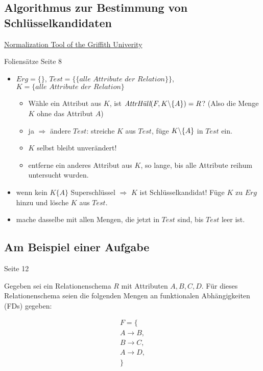 \documentclass{lehramt-informatik}
\begin{document}
\subsection{Algorithmus zur Bestimmung von Schlüsselkandidaten}

\href{http://www.ict.griffith.edu.au/~jw/normalization/ind.php}
{Normalization Tool of the Griffith Univerity}

Foliensätze Seite 8

\begin{itemize}
\item
$Erg = \{\}$,
$Test = \{\{\textit{alle Attribute der Relation}\}\}$,
$K = \{\textit{alle Attribute der Relation}\}$

\begin{itemize}
\item Wähle ein Attribut aus $K$, ist
$\textit{AttrHüll}(F,K \SLASH \{A\}) = R$?
(Also die Menge $K$ ohne das Attribut $A$)

\item ja $\Rightarrow$ ändere $\textit{Test}$:
streiche $K$ aus $\textit{Test}$, füge $K \SLASH \{A\}$ in $\textit{Test}$ ein.

\item $K$ selbst bleibt unverändert!

\item entferne ein anderes Attribut aus $K$, so lange, bis alle
Attribute reihum untersucht wurden.
\end{itemize}

\item wenn kein $K\{A\}$ Superschlüssel $\Rightarrow$
$K$ ist Schlüsselkandidat!
Füge $K$ zu $Erg$ hinzu und lösche $K$ aus $\textit{Test}$.

\item mache dasselbe mit allen Mengen, die jetzt in $\textit{Test}$ sind,
bis $\textit{Test}$ leer ist.

\end{itemize}

\subsection{Am Beispiel einer Aufgabe}

Seite 12

Gegeben sei ein Relationenschema $R$ mit Attributen $A, B, C, D$. Für
dieses Relationenschema seien die folgenden Mengen an funktionalen
Abhängigkeiten (FDs) gegeben:

\begin{multline*}
F = \{ \\
  A \rightarrow B,\\
  B \rightarrow C,\\
  A \rightarrow D,\\
\}
\end{multline*}
\end{document}
